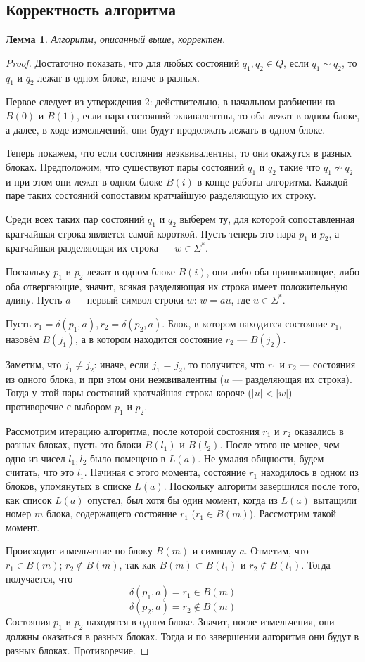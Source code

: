 \documentclass{article}
\newtheorem{lemma}{Лемма}
\begin{document}
\subsection{Корректность алгоритма}
\begin{lemma}
  Алгоритм, описанный выше, корректен.
\end{lemma}
\begin{proof}
  Достаточно показать, что для любых состояний $q_1, q_2 \in Q$, если $q_1 \sim q_2$, то $q_1$ и $q_2$ лежат в одном блоке, иначе в разных.

  Первое следует из утверждения 2: действительно, в начальном разбиении на $B(0)$ и $B(1)$, если пара состояний эквивалентны, то оба лежат в одном блоке, а далее, в ходе измельчений, они будут продолжать лежать в одном блоке.

  Теперь покажем, что если состояния неэквивалентны, то они окажутся в разных блоках. Предположим, что существуют пары состояний $q_1$ и $q_2$ такие что $q_1 \not \sim q_2$ и при этом они лежат в одном блоке $B(i)$ в конце работы алгоритма. Каждой паре таких состояний сопоставим кратчайшую разделяющую их строку.

  Среди всех таких пар состояний $q_1$ и $q_2$ выберем ту, для которой сопоставленная кратчайшая строка является самой короткой. Пусть теперь это пара $p_1$ и $p_2$, а кратчайшая разделяющая их строка --- $w \in \Sigma^*$.

  Поскольку $p_1$ и $p_2$ лежат в одном блоке $B(i)$, они либо оба принимающие, либо оба отвергающие, значит, всякая разделяющая их строка имеет положительную длину. Пусть $a$ --- первый символ строки $w$: $w = au$, где $u \in \Sigma^*$.

  Пусть $r_1 = \delta(p_1, a), r_2 = \delta(p_2, a)$. Блок, в котором находится состояние $r_1$, назовём $B(j_1)$, а в котором находится состояние $r_2$ --- $B(j_2)$.

  Заметим, что $j_1 \neq j_2$: иначе, если $j_1$ = $j_2$, то получится, что $r_1$ и $r_2$ --- состояния из одного блока, и при этом они неэквивалентны ($u$ --- разделяющая их строка). Тогда у этой пары состояний кратчайшая строка короче ($|u| < |w|$) --- противоречие с выбором $p_1$ и $p_2$.

  Рассмотрим итерацию алгоритма, после которой состояния $r_1$ и $r_2$ оказались в разных блоках, пусть это блоки $B(l_1)$ и $B(l_2)$. После этого не менее, чем одно из чисел $l_1, l_2$ было помещено в $L(a)$. Не умаляя общности, будем считать, что это $l_1$. Начиная с этого момента, состояние $r_1$ находилось в одном из блоков, упомянутых в списке $L(a)$. Поскольку алгоритм завершился после того, как список $L(a)$ опустел, был хотя бы один момент, когда из $L(a)$ вытащили номер $m$ блока, содержащего состояние $r_1$ ($r_1 \in B(m)$). Рассмотрим такой момент.

  Происходит измельчение по блоку $B(m)$ и символу $a$. Отметим, что $r_1 \in B(m)$; $r_2 \notin B(m)$, так как $B(m) \subset B(l_1)$ и $r_2 \notin B(l_1)$. Тогда получается, что
  \[\delta(p_1, a) = r_1 \in B(m)\]
  \[\delta(p_2, a) = r_2 \notin B(m)\]
  Состояния $p_1$ и $p_2$ находятся в одном блоке. Значит, после измельчения, они должны оказаться в разных блоках. Тогда и по завершении алгоритма они будут в разных блоках. Противоречие.
\end{proof}
\end{document}
